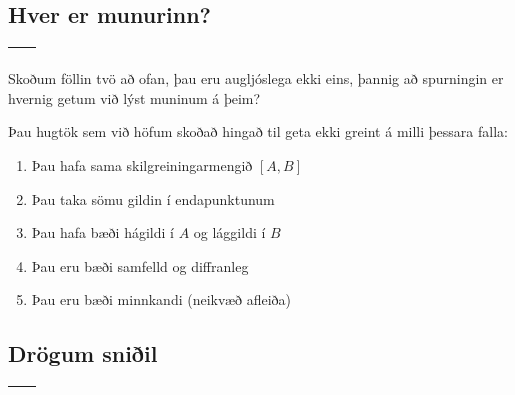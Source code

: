 \documentclass[a4paper,10pt,icelandic]{sphinxmanual}
\begin{document}
\subsection{Hver er munurinn?}
\label{kafli05:hver-er-munurinn}
\noindent\begin{tabulary}{\linewidth}{|L|L|}
\hline
{}\label{kafli05:figa}
&\label{kafli05:figb}
\\
\hline\end{tabulary}


Skoðum föllin tvö að ofan, þau eru augljóslega ekki eins, þannig að
spurningin er hvernig getum við lýst muninum á þeim?

Þau hugtök sem við höfum skoðað hingað til geta ekki greint á milli
þessara falla:
\begin{enumerate}
\item {} 
Þau hafa sama skilgreiningarmengið \([A,B]\)

\item {} 
Þau taka sömu gildin í endapunktunum

\item {} 
Þau hafa bæði hágildi í \(A\) og lággildi í \(B\)

\item {} 
Þau eru bæði samfelld og diffranleg

\item {} 
Þau eru bæði minnkandi (neikvæð afleiða)

\end{enumerate}


\subsection{Drögum sniðil}
\label{kafli05:drogum-sniil}
\noindent\begin{tabulary}{\linewidth}{|L|L|}
\hline
{}\label{kafli05:figa2}
&\label{kafli05:figb2}
\\
\hline\end{tabulary}
\end{document}
